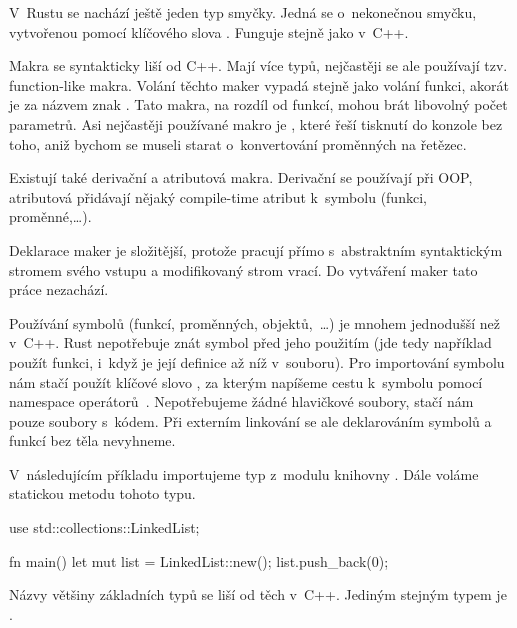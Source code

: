 \documentclass[main.tex]{subfiles}
\begin{document}

V~Rustu se nachází ještě jeden typ smyčky. Jedná se o~nekonečnou smyčku, vytvořenou
pomocí klíčového slova . Funguje stejně jako  v~C++.


Makra se syntakticky liší od C++. Mají více typů, nejčastěji se ale používají tzv.
function-like makra. Volání těchto maker vypadá stejně jako volání funkci, akorát je za
názvem znak \irust{!}. Tato makra, na rozdíl od funkcí, mohou brát libovolný počet
parametrů. Asi nejčastěji používané makro je , které řeší tisknutí do
konzole bez toho, aniž bychom se museli starat o~konvertování proměnných na řetězec.

Existují také derivační a atributová makra. Derivační se používají při OOP, atributová
přidávají nějaký compile-time atribut k~symbolu (funkci, proměnné,\dots).

Deklarace maker je složitější, protože pracují přímo s~abstraktním syntaktickým stromem
svého vstupu a modifikovaný strom vrací. Do vytváření maker tato práce nezachází.


Používání symbolů (funkcí, proměnných, objektů,~\dots) je mnohem jednodušší než v~C++.
Rust nepotřebuje znát symbol před jeho použitím (jde tedy například použít funkci, i~když
je její definice až níž v~souboru). Pro importování symbolu nám stačí použít klíčové slovo
, za kterým napíšeme cestu k~symbolu pomocí namespace operátorů~\irust{::}.
Nepotřebujeme žádné hlavičkové soubory, stačí nám pouze soubory s~kódem. Při externím
linkování se ale deklarováním symbolů a funkcí bez těla nevyhneme.

V~následujícím příkladu importujeme typ  z~modulu 
knihovny . Dále voláme statickou metodu  tohoto typu.

\obrazek
\begin{rustcode}
    use std::collections::LinkedList;

    fn main() {
        let mut list = LinkedList::new();
        list.push_back(0);
    }
\end{rustcode}


Názvy většiny základních typů se liší od těch v~C++. Jediným stejným typem je
.
\end{document}
